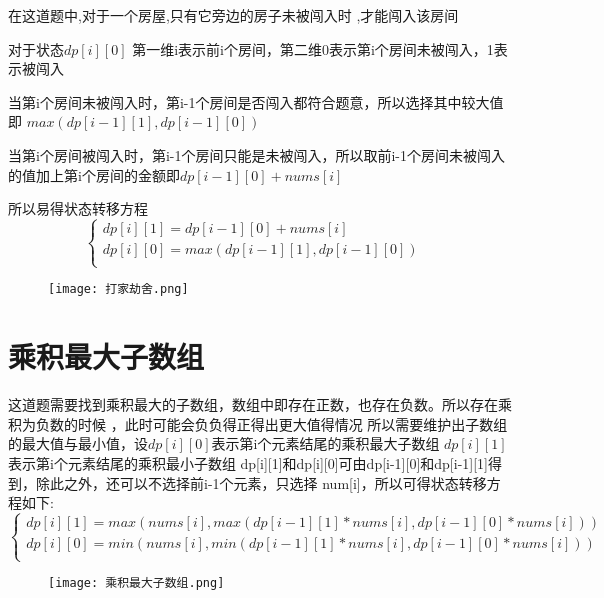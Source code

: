 \documentclass{article}
\begin{document}
在这道题中,对于一个房屋,只有它旁边的房子未被闯入时
,才能闯入该房间


对于状态$dp[i][0]$ 第一维i表示前i个房间，第二维0表示第i个房间未被闯入，1表示被闯入


当第i个房间未被闯入时，第i-1个房间是否闯入都符合题意，所以选择其中较大值即 $max(dp[i-1][1],dp[i-1][0])$


当第i个房间被闯入时，第i-1个房间只能是未被闯入，所以取前i-1个房间未被闯入的值加上第i个房间的金额即$dp[i-1][0]+nums[i]$


所以易得状态转移方程
\begin{equation}
    \begin{cases}
        dp[i][1]=dp[i-1][0]+nums[i] & \text{}\\
        dp[i][0]=max(dp[i-1][1],dp[i-1][0]) & \text{} \\
    
    \end{cases}
    \nonumber
\end{equation}


\begin{figure}[H]
    \begin{flushleft}
    \texttt{[image: 打家劫舍.png]}
    \end{flushleft}
\end{figure}



\newpage
\section{乘积最大子数组}
这道题需要找到乘积最大的子数组，数组中即存在正数，也存在负数。所以存在乘积为负数的时候
，此时可能会负负得正得出更大值得情况
所以需要维护出子数组的最大值与最小值，设$dp[i][0]$表示第i个元素结尾的乘积最大子数组
$dp[i][1]$表示第i个元素结尾的乘积最小子数组
dp[i][1]和dp[i][0]可由dp[i-1][0]和dp[i-1][1]得到，除此之外，还可以不选择前i-1个元素，只选择
num[i]，所以可得状态转移方程如下:
\begin{equation}
    \begin{cases}
        dp[i][1]=max(nums[i],max(dp[i-1][1]*nums[i],dp[i-1][0]*nums[i])) & \text{}\\
        dp[i][0]=min(nums[i],min(dp[i-1][1]*nums[i],dp[i-1][0]*nums[i])) & \text{} \\
    
    \end{cases}
    \nonumber
\end{equation}
\begin{figure}[H]
    \begin{flushleft}
    \texttt{[image: 乘积最大子数组.png]}
    \end{flushleft}
\end{figure}
\end{document}
